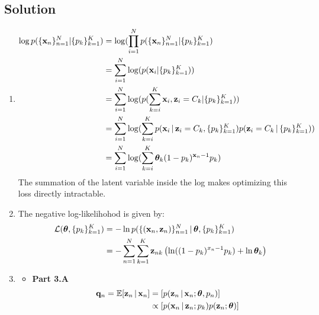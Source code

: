 \documentclass[submit]{harvardml}
\begin{document}
\subsection*{Solution}
\begin{enumerate}
    \item 
        \begin{equation}
            \begin{split}
                \log p(\{\mathbf{x}_n\}^N_{n=1}|\{p_k\}^K_{k = 1}) &= \log (\prod^N_{i=1} p(\{\mathbf{x}_n\}^N_{n=1}|\{p_k\}^K_{k = 1})\\
                &= \sum^N_{i=1} \log (p(\mathbf{x}_i|\{p_k\}^K_{k = 1}))\\
                &= \sum^N_{i=1} \log (p(\sum^K_{k=i}\mathbf{x}_i, \mathbf{z}_i = C_k|\{p_k\}^K_{k = 1}))\\
                &= \sum^N_{i=1} \log ( \sum^K_{k=i} p(\mathbf{x}_i \,|\, \mathbf{z}_i = C_k, \{p_k\}^K_{k = 1})p(\mathbf{z}_i = C_k \,|\, \{p_k\}^K_{k = 1}))\\
                &= \sum^N_{i=1} \log ( \sum^K_{k=i} \boldsymbol{\theta}_k(1-p_k)^{\mathbf{x}_n-1}p_k)
            \end{split}
        \end{equation}
        The summation of the latent variable inside the log makes optimizing this loss directly intractable.
    \item The negative log-likelihohod is given by:
        \begin{equation}
            \begin{split}
                \mathcal{L}(\boldsymbol{\theta}, \{p_k\}^K_{k=1}) &=  -\ln p(\{(\mathbf{x}_n, \mathbf{z}_n)\}_{n=1}^N \,|\,\boldsymbol{\theta}, \{p_k\}^K_{k=1})\\
                &= - \sum^N_{n=1} \sum^K_{k=1} \mathbf{z}_{nk} \left(\ln ((1-p_k)^{x_n - 1}p_k) + \ln \boldsymbol{\theta}_k\right)
            \end{split}
        \end{equation}
    \item
        \begin{itemize}
            \item \textbf{Part 3.A }
                \begin{equation}
                    \begin{split}
                        \boldq_n = \mathbb{E} [\boldz_n \given \boldx_n] &= \left[p(\boldz_n \given \boldx_n; \btheta, p_n)\right] \\
                        &\propto \left[p(\boldx_n \given \boldz_n; p_k)  p(\boldz_n; \btheta)\right] \\

\end{split}
\end{equation}
\end{itemize}
\end{enumerate}
\end{document}
